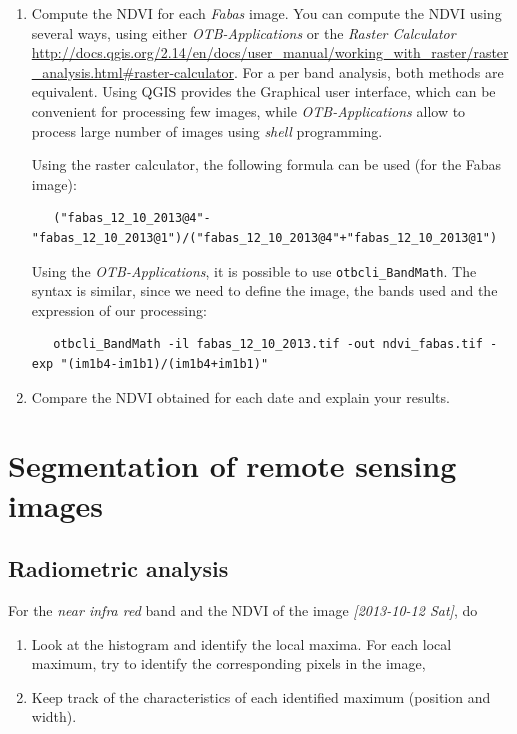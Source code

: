 \documentclass[a4paper,11pt,DIV=18]{scrartcl}
\begin{document}
\begin{work}
\begin{enumerate}
\item Compute  the NDVI for each  \emph{Fabas} image.  You can  compute the NDVI
using several  ways, using  either \emph{OTB-Applications} or  the \emph{Raster
Calculator}
\url{http://docs.qgis.org/2.14/en/docs/user\_manual/working\_with\_raster/raster\_analysis.html\#raster-calculator}.
For a per  band analysis, both methods are  equivalent.  Using QGIS
provides the Graphical user interface,  which can be convenient for
processing  few images,  while  \emph{OTB-Applications}  allow to  process
large number of images using \emph{shell} programming.

Using the raster calculator, the following formula can be used (for
the Fabas image):

\begin{verbatim}
   ("fabas_12_10_2013@4"-"fabas_12_10_2013@1")/("fabas_12_10_2013@4"+"fabas_12_10_2013@1")
\end{verbatim}

Using    the   \emph{OTB-Applications},    it   is    possible   to    use
\texttt{otbcli\_BandMath}. The syntax is similar, since we need to define the
image, the bands used and the expression of our processing:

\begin{verbatim}
   otbcli_BandMath -il fabas_12_10_2013.tif -out ndvi_fabas.tif -exp "(im1b4-im1b1)/(im1b4+im1b1)"
\end{verbatim}

\item Compare the NDVI obtained for each date and explain your results.
\end{enumerate}
\end{work}
\section{Segmentation of remote sensing images}
\label{sec:orga50da32}
\subsection{Radiometric analysis}
\label{sec:org4446b84}
\begin{work}
For   the  \emph{near   infra  red}   band  and   the  NDVI   of  the   image
\textit{[2013-10-12 Sat]}, do
\begin{enumerate}
\item Look  at the  histogram and  identify the  local maxima.   For each
local  maximum, try  to identify  the corresponding  pixels in  the
image,
\item Keep track  of  the characteristics  of  each identified  maximum
(position and width).
\end{enumerate}
\end{work}
\end{document}

